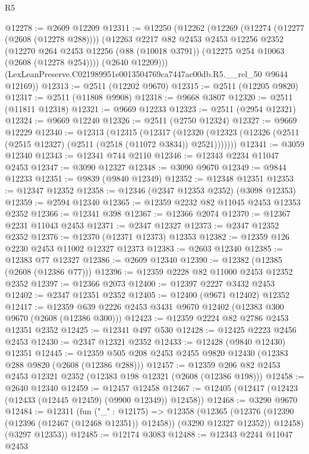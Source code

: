 \begin{lexlean}{R5}
\begin{coremodule}
@12278 := @2609 @12209
@12311 := @12250
    (@12262
      (@12269
        (@12274 (@12277 (@2608 (@12278 @288))))
        (@12263
          @2217
          @82
          @2453
          @2453
          @12256
          @2352
          (@12270 @264 @2453 @12256 (@88 (@10018 @3791)) (@12275 @254 @10063 (@2608 (@12278 @254))))
          (@2640 @12209)))
      (LexLeanPreserve.C021989951e0013504769ca7447ac00db.R5.__rel_50 @9644 @12169))
@12313 := @2511 (@12202 @9670)
@12315 := @2511 (@12205 @9820)
@12317 := @2511 (@11808 @9908)
@12318 := @9668 @3807
@12320 := @2511 (@11811 @12318)
@12321 := @9669 @12233
@12323 := @2511 (@2954 @12321)
@12324 := @9669 @12240
@12326 := @2511 (@2750 @12324)
@12327 := @9669 @12229
@12340 := @12313
    (@12315
      (@12317
        (@12320 (@12323 (@12326 (@2511 (@2515 @12327) (@2511 (@2518 (@11072 @3834)) @2521)))))))
@12341 := @3059 @12340
@12343 := @12341 @744 @2110
@12346 := @12343 @2234 @11047 @2453
@12347 := @3090 @12327
@12348 := @3090 @9670
@12349 := @9844 @12233
@12351 := @9839 (@9840 @12349)
@12352 := @12348 @12351
@12353 := @12347 @12352
@12358 := @12346 (@2347 @12353 @2352) (@3098 @12353)
@12359 := @2594 @12340
@12365 := @12359 @2232 @82 @11045 @2453 @12353 @2352
@12366 := @12341 @398
@12367 := @12366 @2074
@12370 := @12367 @2231 @11043 @2453
@12371 := @2347 @12327
@12373 := @2347 @12352 @2352
@12376 := @12370 (@12371 @12373) @12353
@12382 := @12359 @126 @2230 @2453 @11002 @12327 @12373
@12383 := @2603 @12340
@12385 := @12383 @77 @12327
@12386 := @2609 @12340
@12390 := @12382 (@12385 (@2608 (@12386 @77)))
@12396 := @12359 @2228 @82 @11000 @2453 @12352 @2352
@12397 := @12366 @2073
@12400 := @12397 @2227 @3432 @2453
@12402 := @2347 @12351 @2352
@12405 := @12400 (@9671 @12402) @12352
@12417 := @12359 @639 @2226 @2453 @3431 @9670 @12402 (@12383 @300 @9670 (@2608 (@12386 @300)))
@12423 := @12359 @2224 @82 @2786 @2453 @12351 @2352
@12425 := @12341 @497 @530
@12428 := @12425 @2223 @2456 @2453
@12430 := @2347 @12321 @2352
@12433 := @12428 (@9840 @12430) @12351
@12445 := @12359 @505 @208 @2453 @2455 @9820 @12430 (@12383 @288 @9820 (@2608 (@12386 @288)))
@12457 := @12359 @206 @82 @2453 @2453 @12321 @2352 (@12383 @198 @12321 (@2608 (@12386 @198)))
@12458 := @2640 @12340
@12459 := @12457 @12458
@12467 := @12405 (@12417 (@12423 (@12433 (@12445 @12459) (@9900 @12349)) @12458))
@12468 := @3290 @9670
@12484 := @12311
    (fun ("_" : @12175) =>
    @12358
      (@12365
        (@12376 (@12390 (@12396 (@12467 (@12468 @12351)) @12458)) (@3290 @12327 @12352))
        @12458)
      (@3297 @12353))
@12485 := @12174 @3083
@12488 := @12343 @2244 @11047 @2453

\end{coremodule}
\end{lexlean}
